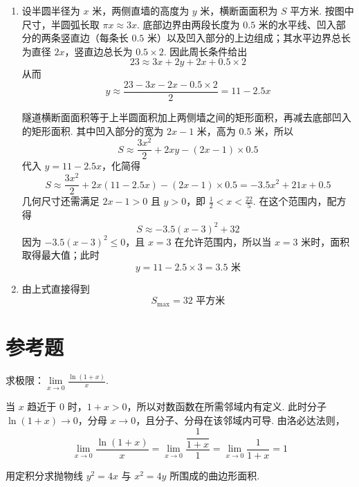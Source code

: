 \begin{solution}
\begin{enumerate}
\item 设半圆半径为 \(x\) 米，两侧直墙的高度为 \(y\) 米，横断面面积为 \(S\) 平方米. 按图中尺寸，半圆弧长取 \(\pi x\approx3x\). 底部边界由两段长度为 \(0.5\) 米的水平线、凹入部分的两条竖直边（每条长 \(0.5\) 米）以及凹入部分的上边组成；其水平边界总长为直径 \(2x\)，竖直边总长为 \(0.5\times2\). 因此周长条件给出
\[
23\approx3x+2y+2x+0.5\times2
\]
从而
\[
y\approx\frac{23-3x-2x-0.5\times2}{2}=11-2.5x
\]

隧道横断面面积等于上半圆面积加上两侧墙之间的矩形面积，再减去底部凹入的矩形面积. 其中凹入部分的宽为 \(2x-1\) 米，高为 \(0.5\) 米，所以
\[
S\approx\frac{3x^2}{2}+2xy-\left( 2x-1 \right)\times0.5
\]
代入 \(y=11-2.5x\)，化简得
\[
S\approx\frac{3x^2}{2}+2x\left( 11-2.5x \right)-\left( 2x-1 \right)\times0.5=-3.5x^2+21x+0.5
\]
几何尺寸还需满足 \(2x-1>0\) 且 \(y>0\)，即 \(\frac{1}{2}<x<\frac{22}{5}\). 在这个范围内，配方得
\[
S\approx-3.5\left( x-3 \right)^2+32
\]
因为 \(-3.5\left( x-3 \right)^2\leqslant0\)，且 \(x=3\) 在允许范围内，所以当 \(x=3\) 米时，面积取得最大值；此时
\[
y=11-2.5\times3=3.5\text{ 米}
\]

\item 由上式直接得到
\[
S_{\max}=32\text{ 平方米}
\]
\end{enumerate}
\end{solution}

\section{参考题}

\begin{problem}
求极限：\(\lim\limits_{x\to0}\frac{\ln\left( 1+x \right)}{x}\).
\end{problem}

\begin{solution}
当 \(x\) 趋近于 \(0\) 时，\(1+x>0\)，所以对数函数在所需邻域内有定义. 此时分子 \(\ln\left( 1+x \right)\to0\)，分母 \(x\to0\)，且分子、分母在该邻域内可导. 由洛必达法则，
\[
\lim\limits_{x\to0}\frac{\ln\left( 1+x \right)}{x}
=\lim\limits_{x\to0}\frac{\dfrac{1}{1+x}}{1}
=\lim\limits_{x\to0}\frac{1}{1+x}=1
\]
\end{solution}

\begin{problem}
用定积分求抛物线 \(y^2=4x\) 与 \(x^2=4y\) 所围成的曲边形面积.
\end{problem}

